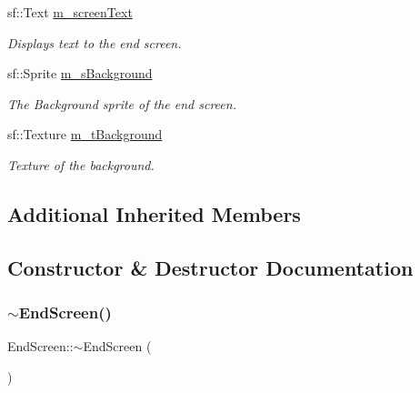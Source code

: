 \begin{DoxyCompactItemize}
sf\+::\+Text \mbox{\hyperlink{class_end_screen_a63e6204ce588b54205a973d9607cb34d}{m\+\_\+screen\+Text}}
\begin{DoxyCompactList}\small\item\em Displays text to the end screen. \end{DoxyCompactList}\item 
\mbox{\label{class_end_screen_aeb22f5f583972358483e76eb0ae34e68}} 
sf\+::\+Sprite \mbox{\hyperlink{class_end_screen_aeb22f5f583972358483e76eb0ae34e68}{m\+\_\+s\+Background}}
\begin{DoxyCompactList}\small\item\em The Background sprite of the end screen. \end{DoxyCompactList}\item 
\mbox{\label{class_end_screen_a2c4defa1110c242bef3ada6e6404d549}} 
sf\+::\+Texture \mbox{\hyperlink{class_end_screen_a2c4defa1110c242bef3ada6e6404d549}{m\+\_\+t\+Background}}
\begin{DoxyCompactList}\small\item\em Texture of the background. \end{DoxyCompactList}\end{DoxyCompactItemize}
\subsection*{Additional Inherited Members}


\subsection{Constructor \& Destructor Documentation}
\mbox{\label{class_end_screen_a2bf71fd8fe94ee4ff206ff5303110864}} 
\subsubsection{\texorpdfstring{$\sim$\+End\+Screen()}{~EndScreen()}}
{\footnotesize\ttfamily End\+Screen\+::$\sim$\+End\+Screen (\begin{DoxyParamCaption}{ }\end{DoxyParamCaption})}



